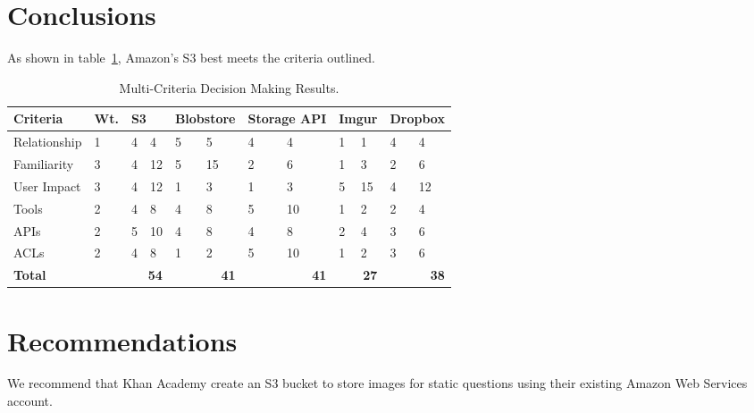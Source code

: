 \documentclass[se]{uw-wkrpt}
\begin{document}
\section{Conclusions}

As shown in table~\ref{tbl:mcdm}, Amazon's S3 best meets the criteria outlined.

\begin{table}
  \caption{Multi-Criteria Decision Making Results.}
  \label{tbl:mcdm}
  \centering
  \begin{tabular}{|p{3.0cm}|p{0.75cm}|
                   p{0.75cm}|p{0.75cm}|p{0.75cm}|p{0.75cm}|p{0.75cm}|
                   p{0.75cm}|p{0.75cm}|p{0.75cm}|p{0.75cm}|p{0.75cm}|}
    \hline
    \textbf{Criteria} &
    \textbf{Wt.} &
    \multicolumn{2}{|p{1.50cm}|}{\textbf{S3}} &
    \multicolumn{2}{|p{1.50cm}|}{\textbf{Blobstore}} &
    \multicolumn{2}{|p{1.50cm}|}{\textbf{Storage API}} &
    \multicolumn{2}{|p{1.50cm}|}{\textbf{Imgur}} &
    \multicolumn{2}{|p{1.50cm}|}{\textbf{Dropbox}} \\
    \hline
    \hline
    Relationship &
       1 &  4 &  4 &  5 &  5 &  4 &  4 &  1 &  1 &  4 &  4 \\
    \hline
    Familiarity &
       3 &  4 & 12 &  5 &  15 &  2 &  6 &  1 &  3 &  2 &  6 \\
    \hline
    User Impact &
       3 &  4 & 12 &  1 &  3 &  1 &  3 &  5 & 15 &  4 & 12 \\
    \hline
    Tools &
       2 &  4 &  8 &  4 &  8 &  5 & 10 &  1 &  2 &  2 &  4 \\
    \hline
    APIs &
       2 &  5 & 10 &  4 &  8 &  4 &  8 &  2 &  4 &  3 &  6 \\
    \hline
    ACLs &
       2 &  4 &  8 &  1 &  2 &  5 & 10 &  1 &  2 &  3 &  6 \\
    \hline
    \hline
    \textbf{Total} &
      &
      \multicolumn{2}{|r|}{\textbf{54}} &
      \multicolumn{2}{|r|}{\textbf{41}} &
      \multicolumn{2}{|r|}{\textbf{41}} &
      \multicolumn{2}{|r|}{\textbf{27}} &
      \multicolumn{2}{|r|}{\textbf{38}} \\
    \hline
  \end{tabular}
\end{table}

\section{Recommendations}
We recommend that Khan Academy create an S3 bucket to store images for static 
questions using their existing Amazon Web Services account.
\end{document}

